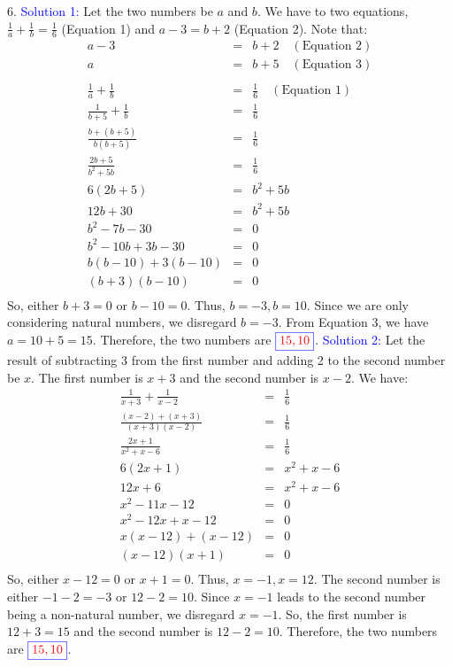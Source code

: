 \documentclass[addpoints, 12pt]{exam}
\theoremstyle{remark}
\begin{document}
6.
\textcolor{blue}{Solution 1:} \newline
Let the two numbers be $a$ and $b$. We have to two equations, $\frac{1}{a} + \frac{1}{b} = \frac{1}{6}$ (Equation 1) and $a-3=b+2$ (Equation 2). Note that:
\begin{eqnarray*}
    a-3 & = & b+2 \quad (\text{Equation 2})\\
    a & = & b+5 \quad (\text{Equation 3})\\\\
    \frac{1}{a} + \frac{1}{b} & = & \frac{1}{6} \quad (\text{Equation 1})\\
    \frac{1}{b+5} + \frac{1}{b} & = & \frac{1}{6} \\
    \frac{b + (b + 5)}{b(b+5)} & = & \frac{1}{6} \\
    \frac{2b + 5}{b^2 + 5b} & = & \frac{1}{6} \\
    6(2b+5) & = & b^2+5b \\
    12b + 30 & = & b^2+5b \\
    b^2 - 7b - 30 & = & 0 \\
    b^2 - 10b + 3b - 30 & = & 0 \\
    b(b-10)+3(b-10) & = & 0 \\
    (b+3)(b-10) & = & 0 \\
\end{eqnarray*}
So, either $b+3=0$ or $b-10=0$. Thus, $b = -3, b=10$. Since we are only considering natural numbers, we disregard $b=-3$. From Equation 3, we have $a = 10 + 5 = 15$. Therefore, the two numbers are {\boldmath $\textcolor{blue}{\boxed{\textcolor{red}{15, 10}}}$}.
\newline
\textcolor{blue}{Solution 2:} \newline
Let the result of subtracting 3 from the first number and adding 2 to the second number be $x$. The first number is $x+3$ and the second number is $x-2$. We have:
\begin{eqnarray*}
    \frac{1}{x+3} + \frac{1}{x-2} & = & \frac{1}{6} \\
    \frac{(x-2) + (x+3)}{(x+3)(x-2)} & = & \frac{1}{6} \\
    \frac{2x+1}{x^2+x-6} & = & \frac{1}{6} \\
    6(2x+1) & = & x^2+x-6 \\
    12x + 6 & = & x^2+x-6 \\
    x^2 - 11x - 12 & = & 0 \\
    x^2 - 12x + x - 12 & = & 0 \\
    x(x-12) + (x-12) & = & 0\\
    (x-12)(x+1) & = & 0 \\
\end{eqnarray*}
So, either $x-12=0$ or $x+1=0$. Thus, $x = -1, x=12$. The second number is either $-1 - 2 = -3$ or $12 - 2 = 10$. Since $x=-1$ leads to the second number being a non-natural number, we disregard $x=-1$. So, the first number is $12+3 = 15$ and the second number is $12 - 2 = 10$. Therefore, the two numbers are {\boldmath $\textcolor{blue}{\boxed{\textcolor{red}{15, 10}}}$}.
\newline
\end{document}
